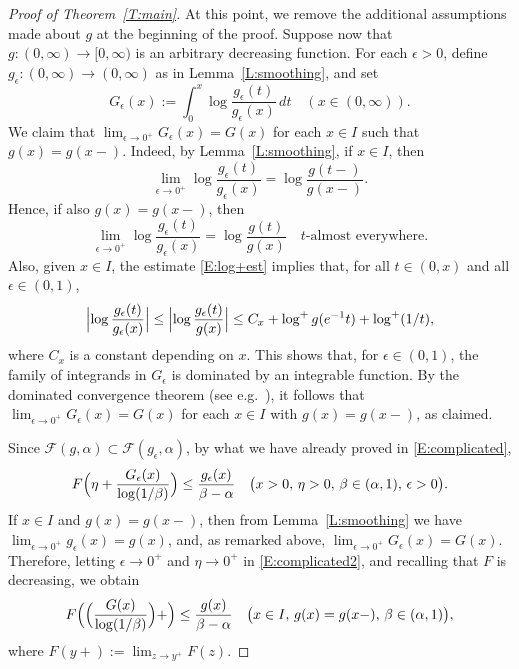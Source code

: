\documentclass[11pt,reqno]{amsart}
\theoremstyle{plain}
\theoremstyle{definition}
\theoremstyle{remark}
\newcommand{\cF}{\mathcal{F}}
\begin{document}
\begin{proof}[Proof of Theorem~\ref{T:main}]
At this point, we remove the additional
assumptions made about $g$ at the beginning of the proof. 
Suppose now that  $g:(0,\infty)\to[0,\infty)$ is an arbitrary decreasing function.
For each $\epsilon>0$, define
$g_\epsilon:(0,\infty)\to(0,\infty)$ 
as in Lemma~\ref{L:smoothing},
and set
\[
G_\epsilon(x):=\int_0^x\log \frac{g_\epsilon(t)}{g_\epsilon(x)}\,dt
\quad(x\in(0,\infty)).
\]
We claim that $\lim_{\epsilon\to0^+}G_\epsilon(x)=G(x)$
for each $x\in I$ such that $g(x)=g(x-)$. Indeed, by Lemma~\ref{L:smoothing}, if $x\in I$, then
\[
\lim_{\epsilon\to0^+}\log\frac{g_\epsilon(t)}{g_\epsilon(x)}= \log\frac{g(t-)}{g(x-)}.
\]
Hence, if also $g(x)=g(x-)$, then
\[
\lim_{\epsilon\to0^+}\log\frac{g_\epsilon(t)}{g_\epsilon(x)}= \log\frac{g(t)}{g(x)} \quad\text{$t$-almost everywhere}.
\]
Also, given $x\in I$,  the estimate \eqref{E:log+est} implies that,
for all $t\in(0,x)$ and all $\epsilon\in(0,1)$,
\[
\Bigl|\log\frac{g_\epsilon(t)}{g_\epsilon(x)}\Bigr|
\le \Bigl|\log\frac{g_\epsilon(t)}{g(x)}\Bigr|
\le C_x+\log^+g(e^{-1}t)+\log^+(1/t),
\]
where $C_x$ is a constant depending on $x$. This shows that, for $\epsilon\in(0,1)$, the family of integrands in $G_\epsilon$
is dominated by an integrable function.
By the dominated convergence theorem 
(see e.g.\ \cite[Theorem~1.34]{Ru87}), it follows that $\lim_{\epsilon\to0^+}G_\epsilon(x)=G(x)$ for each $x\in I$
with $g(x)=g(x-)$, as claimed.


Since $\cF(g,\alpha)\subset\cF(g_\epsilon,\alpha)$,
by what we have already proved in \eqref{E:complicated},
\begin{equation}\label{E:complicated2}
F\Bigl(\eta+\frac{G_\epsilon(x)}{\log(1/\beta)}\Bigr)
\le\frac{g_\epsilon(x)}{\beta-\alpha} 
\quad\bigl(x>0,\,\eta>0,\,\beta\in(\alpha,1),\,\epsilon>0\bigr).
\end{equation}
If $x\in I$
and $g(x)=g(x-)$,
then from Lemma~\ref{L:smoothing} we have $\lim_{\epsilon\to0^+}g_\epsilon(x)=g(x)$, and, as remarked above, 
$\lim_{\epsilon\to0^+}G_\epsilon(x)=G(x)$.
Therefore, letting $\epsilon\to0^+$ and $\eta\to0^+$ in 
\eqref{E:complicated2}, 
and recalling that $F$ is decreasing, we obtain
\begin{equation}\label{E:nearly}
F\Bigl(\Bigl(\frac{G(x)}{\log(1/\beta)}\Bigr)+\Bigr)
\le\frac{g(x)}{\beta-\alpha} 
\quad\bigl(x\in I,\,g(x)=g(x-),\,\beta\in(\alpha,1)\bigr),
\end{equation}
where $F(y+):=\lim_{z\to y^+}F(z)$.


\end{proof}
\end{document}
